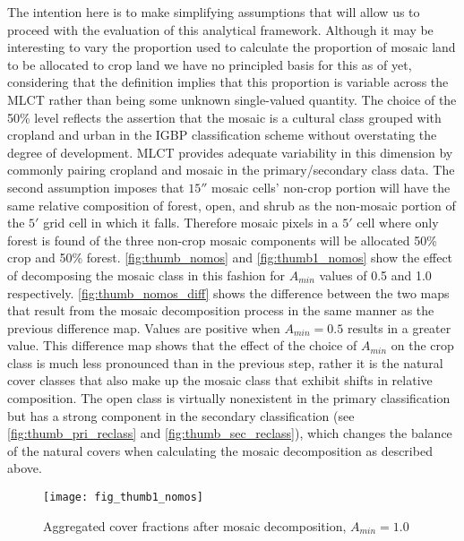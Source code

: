 The intention here is to make simplifying assumptions that will allow
us to proceed with the evaluation of this analytical framework.
Although it may be interesting to vary the proportion used to
calculate the proportion of mosaic land to be allocated to crop land
we have no principled basis for this as of yet, considering that the
definition implies that this proportion is variable across the MLCT
rather than being some unknown single-valued quantity.  The choice of
the 50\% level reflects the assertion that the mosaic is a cultural
class grouped with cropland and urban in the IGBP classification
scheme without overstating the degree of development.  MLCT provides
adequate variability in this dimension by commonly pairing cropland
and mosaic in the primary/secondary class data.  The second assumption
imposes that $15''$ mosaic cells' non-crop portion will have the same
relative composition of forest, open, and shrub as the non-mosaic
portion of the $5'$ grid cell in which it falls. Therefore mosaic
pixels in a $5'$ cell where only forest is found of the three non-crop
mosaic components will be allocated 50\% crop and 50\% forest.
\autoref{fig:thumb_nomos} and \autoref{fig:thumb1_nomos} show the
effect of decomposing the mosaic class in this fashion for $A_{min}$
values of 0.5 and 1.0 respectively. \autoref{fig:thumb_nomos_diff}
shows the difference between the two maps that result from the mosaic
decomposition process in the same manner as the previous difference
map.  Values are positive when $A_{min}=0.5$ results in a greater
value.  This difference map shows that the effect of the choice of
$A_{min}$ on the crop class is much less pronounced than in the
previous step, rather it is the natural cover classes that also make
up the mosaic class that exhibit shifts in relative composition.  The
open class is virtually nonexistent in the primary classification but
has a strong component in the secondary classification (see
\autoref{fig:thumb_pri_reclass} and \autoref{fig:thumb_sec_reclass}), which
changes the balance of the natural covers when calculating the mosaic
decomposition as described above.




\begin{figure}[ht]
\centering
  


\texttt{[image: fig\_thumb1\_nomos]}
 
\caption{Aggregated cover fractions after mosaic decomposition, $A_{min}=1.0$}
\label{fig:thumb1_nomos}
\end{figure} 

